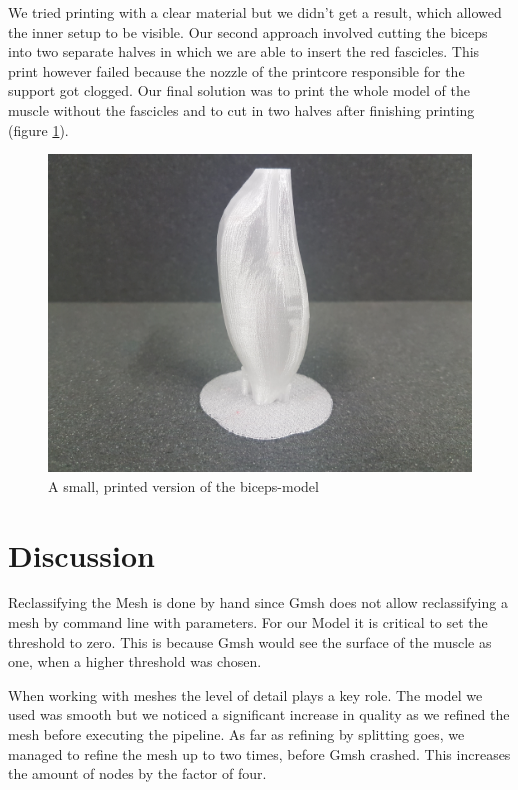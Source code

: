 \documentclass[preprint,journal]{vgtc}       %
\begin{document}
We tried printing with a clear material but we didn't get a result, which allowed the inner setup to be visible. 
Our second approach involved cutting the biceps into two separate halves in which we are able to insert the red fascicles. 
This print however failed because the nozzle of the printcore responsible for the support got clogged. 
Our final solution was to print the whole model of the muscle without the fascicles and to cut in two halves after finishing printing (figure \ref{fig:printedBiceps}). 

\begin{figure}[H]
		\includegraphics[width=.8\linewidth]{small_print.jpg} %
		\caption{A small, printed version of the biceps-model}
		\label{fig:printedBiceps}
\end{figure}

\section{Discussion}
Reclassifying the Mesh is done by hand since Gmsh does not allow reclassifying a mesh by command line with parameters. 
For our Model it is critical to set the threshold to zero. 
This is because Gmsh would see the surface of the muscle as one, when a higher threshold was chosen.

When working with meshes the level of detail plays a key role. 
The model we used was smooth but we noticed a significant increase in quality as we refined the mesh before executing the pipeline. 
As far as refining by splitting goes, we managed to refine the mesh up to two times, before Gmsh crashed.
This increases the amount of nodes by the factor of four. %
\end{document}
